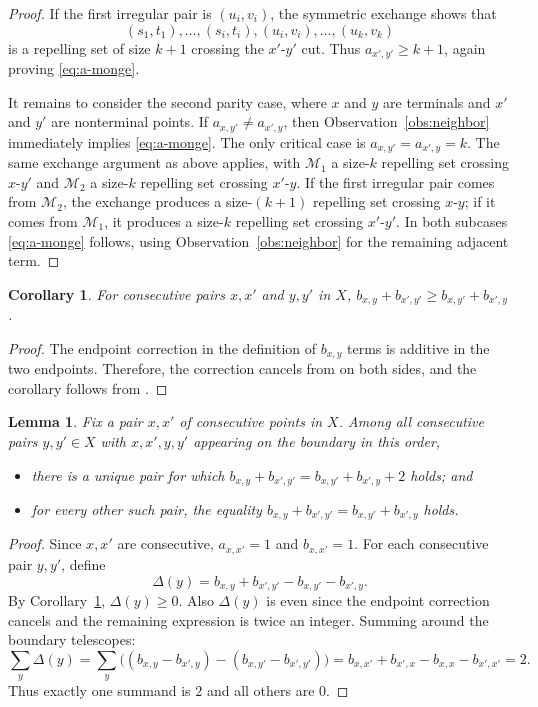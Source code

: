 \documentclass[11pt]{article}
\newtheorem{corollary}[theorem]{Corollary}
\newtheorem{lemma}[theorem]{Lemma}
\newcommand{\mset}{{\mathcal M}}
\begin{document}
\begin{proof}
If the first irregular pair is $(u_i,v_i)$, the symmetric exchange shows that
\[
   (s_1,t_1),\ldots,(s_i,t_i),(u_i,v_i),\ldots,(u_k,v_k)
\]
is a repelling set of size $k+1$ crossing the $x'$-$y'$ cut.  Thus $a_{x',y'}\ge k+1$, again proving \eqref{eq:a-monge}.

It remains to consider the second parity case, where $x$ and $y$ are terminals and $x'$ and $y'$ are nonterminal points.  If $a_{x,y'}\ne a_{x',y}$, then Observation~\ref{obs:neighbor} immediately implies \eqref{eq:a-monge}.  The only critical case is $a_{x,y'}=a_{x',y}=k$.  The same exchange argument as above applies, with $\mset_1$ a size-$k$ repelling set crossing $x$-$y'$ and $\mset_2$ a size-$k$ repelling set crossing $x'$-$y$.  If the first irregular pair comes from $\mset_2$, the exchange produces a size-$(k+1)$ repelling set crossing $x$-$y$; if it comes from $\mset_1$, it produces a size-$k$ repelling set crossing $x'$-$y'$.  In both subcases \eqref{eq:a-monge} follows, using Observation~\ref{obs:neighbor} for the remaining adjacent term.
\end{proof}

\begin{corollary}\label{cor:b-monge}
For consecutive pairs $x,x'$ and $y,y'$ in $X$,
$b_{x,y}+b_{x',y'}\ge b_{x,y'}+b_{x',y}$.
\end{corollary}

\begin{proof}
The endpoint correction in the definition of $b_{x,y}$ terms is additive in the two endpoints. Therefore, the correction cancels from on both sides, and the corollary follows from .
\end{proof}

\begin{lemma}\label{lem:unit-diff}
Fix a pair $x,x'$ of consecutive points in $X$.  Among all consecutive pairs $y,y'\in X$ with $x,x',y,y'$ appearing on the boundary in this order,
\begin{itemize}
    \item there is a unique pair for which
$b_{x,y}+b_{x',y'}=b_{x,y'}+b_{x',y}+2$ holds; and
\item for every other such pair, the equality $b_{x,y}+b_{x',y'}=b_{x,y'}+b_{x',y}$ holds.
\end{itemize}
\end{lemma}

\begin{proof}
Since $x,x'$ are consecutive, $a_{x,x'}=1$ and $b_{x,x'}=1$.  For each consecutive pair $y,y'$, define
\[
   \Delta(y)=b_{x,y}+b_{x',y'}-b_{x,y'}-b_{x',y}.
\]
By Corollary~\ref{cor:b-monge}, $\Delta(y)\ge 0$.  Also $\Delta(y)$ is even since the endpoint correction cancels and the remaining expression is twice an integer.  Summing around the boundary telescopes:
\[
\sum_y \Delta(y)
 =\sum_y \bigl((b_{x,y}-b_{x',y})-(b_{x,y'}-b_{x',y'})\bigr)
 =b_{x,x'}+b_{x',x}-b_{x,x}-b_{x',x'}=2.
\]
Thus exactly one summand is $2$ and all others are $0$.
\end{proof}
\end{document}
